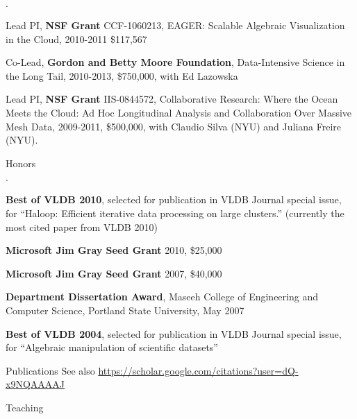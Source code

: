 \documentclass[10pt]{article}
\newenvironment{bulletlist}
   {
      \begin{list}
         {$\cdot$}
         {
            \setlength{\itemsep}{.5ex}
            \setlength{\parsep}{0ex}
            \setlength{\leftmargin}{0.7em}
            \setlength{\parskip}{0ex}
            \setlength{\topsep}{0ex}
         }
   }
   {
      \end{list}
   }
\newcommand{\marginlabel}[1]{
\begin{minipage}[b]{0.8\labelwidth}{\large \textsf{\textbf{#1}}}\end{minipage}}
\newcommand{\entrylabel}[1]{\mbox{\marginlabel{#1}}\hfill}
\newcommand{\MainListlabel}[1]
   {
      \parbox[t]{\labelwidth}{\hspace{.8em}\marginlabel{#1}}
   }
\newenvironment{MainList}[1]
   {
      \renewcommand{\entrylabel}{\MainListlabel}
      \begin{list}{}
      {
         \renewcommand{\makelabel}{\entrylabel}
         \setlength   {\itemindent}{-.65em}
         \setlength   {\labelwidth}{#1}
         \setlength   {\leftmargin}{\labelwidth}
         \setlength   {\itemsep}{3ex}
      }
   }
   {
      \end{list}
   }
\begin{document}
\begin{MainList}{88pt}
\begin{bulletlist}
\item Lead PI, {\bf NSF Grant} CCF-1060213, EAGER: Scalable Algebraic Visualization in the Cloud, 2010-2011 \$117,567

\item Co-Lead, {\bf Gordon and Betty Moore Foundation}, Data-Intensive Science in the Long Tail, 2010-2013, \$750,000, with Ed Lazowska

\item Lead PI, {\bf NSF Grant} IIS-0844572, Collaborative Research: Where the Ocean Meets the Cloud: Ad Hoc Longitudinal Analysis and Collaboration Over Massive Mesh Data, 2009-2011, \$500,000, with Claudio Silva (NYU) and Juliana Freire (NYU).

\end{bulletlist}

\item [Honors]
\begin{bulletlist}


\item {\bf Best of VLDB 2010}, selected for publication in VLDB Journal special issue, for ``Haloop: Efficient iterative data processing on large clusters.'' (currently the most cited paper from VLDB 2010)

\item {\bf Microsoft Jim Gray Seed Grant} 2010, \$25,000

\item {\bf Microsoft Jim Gray Seed Grant} 2007, \$40,000

\item {\bf Department Dissertation Award}, Maseeh College of Engineering and Computer Science, Portland State University, May 2007

\item {\bf Best of VLDB 2004}, selected for publication in VLDB Journal special issue, for ``Algebraic manipulation of scientific datasets'' 

\end{bulletlist}

\item[Publications] 
See also \url{https://scholar.google.com/citations?user=dQ-x9NQAAAAJ}




\item [Teaching]



\end{MainList}
\end{document}
